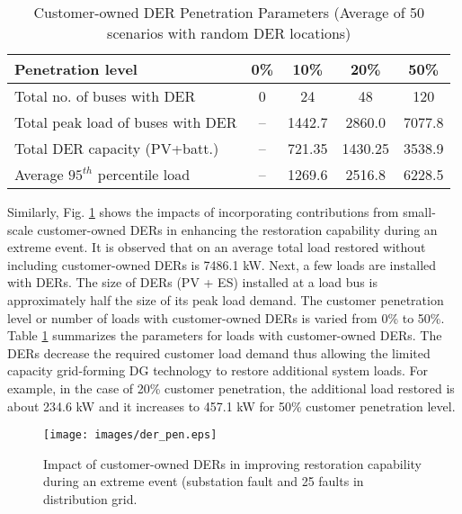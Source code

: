 \documentclass[12pt]{article}
\begin{document}
\begin{table}[h]
    \centering
    \caption{Customer-owned DER Penetration Parameters (Average of 50 scenarios with random DER locations)}
    \label{table:2}
    \begin{tabular}{l|cccc}
        \toprule[0.4 mm]
        Penetration level& 0\%& 10\% & 20\% &50\% \\
        \hline
        Total no. of buses with DER & 0 & 24 & 48 & 120 \\
        \hline
        Total peak load of buses with DER& -- & 1442.7 & 2860.0 & 7077.8  \\
        \hline
        Total DER capacity (PV+batt.) & -- & 721.35 & 1430.25 & 3538.9\\
        \hline
        Average $95^{th}$ percentile load & -- & 1269.6 & 2516.8 & 6228.5 \\
        \toprule[0.4 mm]
    \end{tabular}
    \vspace{-0.2 cm}
\end{table}

Similarly, Fig. \ref{non_util} shows the impacts of incorporating contributions from small-scale customer-owned DERs in enhancing the restoration capability during an extreme event. It is observed that on an average total load restored without including customer-owned DERs is 7486.1 kW. Next, a few loads are installed with DERs. The size of DERs (PV + ES) installed at a load bus is approximately half the size of its peak load demand. The customer penetration level or number of loads with customer-owned DERs is varied from 0\% to 50\%. Table \ref{table:2} summarizes the parameters for loads with customer-owned DERs. The DERs decrease the required customer load demand thus allowing the limited capacity grid-forming DG technology to restore additional system loads.  For example, in the case of 20\% customer penetration, the additional load restored is about 234.6 kW and it increases to 457.1 kW for 50\% customer penetration level. 



\begin{figure}[h]
    \centering
    \texttt{[image: images/der\_pen.eps]}
        \vspace{-0.4 cm}
    \caption{Impact of customer-owned DERs in improving restoration capability during an extreme event (substation fault and 25 faults in distribution grid.}
    \label{non_util}
\end{figure}
	
\end{document}
